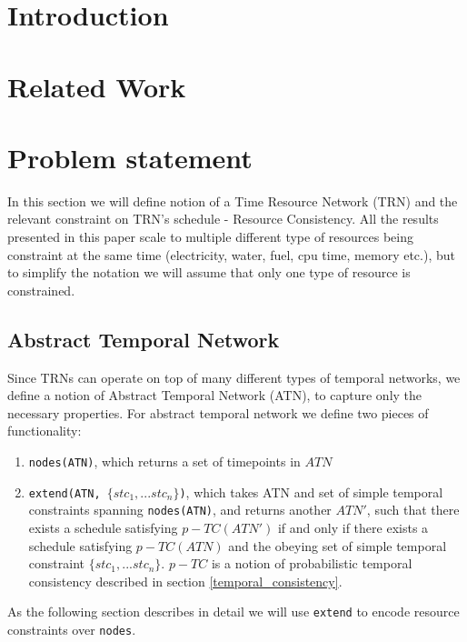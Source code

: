 \documentclass{article}
\begin{document}
\begin{multicols}{2}
\begin{abstract}
\noindent %
\end{abstract}
\section{Introduction}

\section{Related Work}

\section{Problem statement}
In this section we will define notion of a Time Resource Network (TRN) and the relevant constraint on TRN's schedule - Resource Consistency. All the results presented in this paper scale to multiple different type of resources being constraint at the same time (electricity, water, fuel, cpu time, memory etc.), but to simplify the notation we will assume that only one type of resource is constrained.
\subsection{Abstract Temporal Network}
Since TRNs can operate on top of many different types of temporal networks, we define a notion of Abstract Temporal Network (ATN), to capture only the necessary properties. For abstract temporal network we define two pieces of functionality:
\begin{enumerate}
\item \texttt{nodes(ATN)}, which returns a set of timepoints in $ATN$
\item \texttt{extend(ATN, $\{ stc_1, ... stc_n \} $)}, which takes ATN and set of simple temporal constraints \cite{cervoni1993maintaining} spanning \texttt{nodes(ATN)}, and returns another $ATN'$, such that there exists a schedule satisfying $p-TC(ATN')$ if and only if there exists a schedule satisfying $p-TC(ATN)$ and the obeying set of simple temporal constraint $\{ stc_1, ... stc_n \} $. $p-TC$ is a notion of probabilistic temporal consistency described in section \ref{temporal_consistency}.
\end{enumerate}
As the following section describes in detail we will use \texttt{extend} to encode resource constraints over \texttt{nodes}.

\end{multicols}
\end{document}
